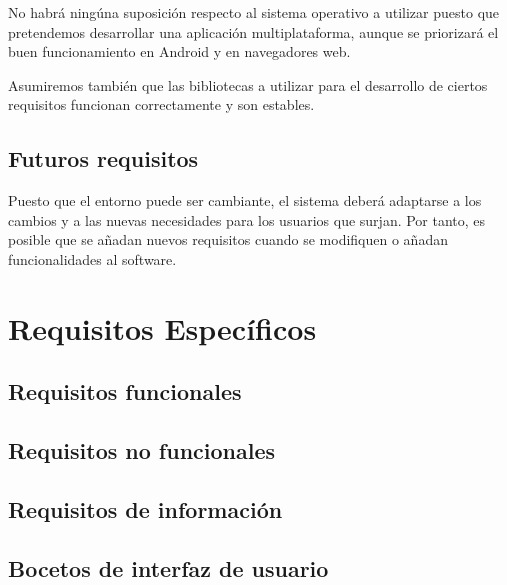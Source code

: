 No habrá ningúna suposición respecto al sistema operativo a utilizar puesto que pretendemos desarrollar una aplicación multiplataforma, aunque se priorizará el buen funcionamiento en Android y en navegadores web.

Asumiremos también que las bibliotecas a utilizar para el desarrollo de ciertos requisitos funcionan correctamente y son estables.

\subsection{Futuros requisitos}
Puesto que el entorno puede ser cambiante, el sistema deberá adaptarse a los cambios y a las nuevas necesidades para los usuarios que surjan.
Por tanto, es posible que se añadan nuevos requisitos cuando se modifiquen o añadan funcionalidades al software.

\section{Requisitos Específicos}
\subsection{Requisitos funcionales}
\subsection{Requisitos no funcionales}
\subsection{Requisitos de información}
\subsection{Bocetos de interfaz de usuario}